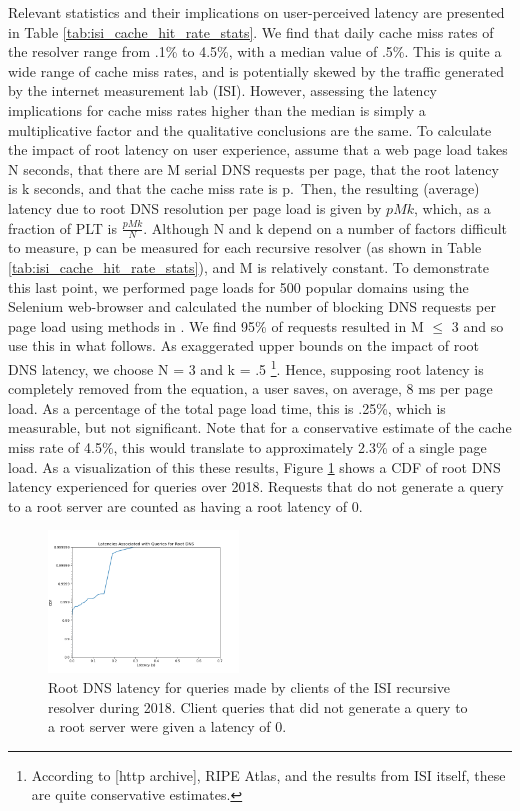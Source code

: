 \documentclass[sigconf,nonacm,10pt]{acmart}
\begin{document}
Relevant statistics and their implications on user-perceived latency are
presented in Table \ref{tab:isi_cache_hit_rate_stats}. We find that
daily cache miss rates of the resolver range from .1\% to 4.5\%, with a
median value of .5\%. This is quite a wide range of cache miss rates,
and is potentially skewed by the traffic generated by the internet
measurement lab (ISI). However, assessing the latency implications for
cache miss rates higher than the median is simply a multiplicative
factor and the qualitative conclusions are the same. \break \break
To calculate the impact of root latency on user experience, assume that
a web page load takes N seconds, that there are M serial DNS requests
per page, that the root latency is k seconds, and that the cache miss
rate is p.~Then, the resulting (average) latency due to root DNS
resolution per page load is given by \(pMk\), which, as a fraction of
PLT is \(\frac{p M k}{N}\). \break \break
Although N and k depend on a number of factors difficult to measure, p
can be measured for each recursive resolver (as shown in Table
\ref{tab:isi_cache_hit_rate_stats}), and M is relatively constant. To
demonstrate this last point, we performed page loads for 500 popular
domains using the Selenium web-browser and calculated the number of
blocking DNS requests per page load using methods in
\cite{sundaresan2013web}. We find 95\% of requests resulted in M
\(\leq\) 3 and so use this in what follows. \break
As exaggerated upper bounds on the impact of root DNS latency, we choose
N = 3 and k = .5
\footnote{ According to [http archive], RIPE Atlas, and the results from ISI itself, these are quite conservative estimates. }.
Hence, supposing root latency is completely removed from the equation, a
user saves, on average, 8 ms per page load. As a percentage of the total
page load time, this is .25\%, which is measurable, but not significant.
Note that for a conservative estimate of the cache miss rate of 4.5\%,
this would translate to approximately 2.3\% of a single page load.
\break \break
As a visualization of this these results, Figure
\ref{fig:isi_root_dns_latency} shows a CDF of root DNS latency
experienced for queries over 2018. Requests that do not generate a query
to a root server are counted as having a root latency of 0.

\begin{figure}
    \centering
    \includegraphics[width=0.45\textwidth]{figures/isi_root_dns_latency.png}
    \caption{Root DNS latency for queries made by clients of the ISI recursive resolver during 2018. Client queries that did not generate a query to a root server were given a latency of 0. }
    \label{fig:isi_root_dns_latency}
\end{figure}
\end{document}
